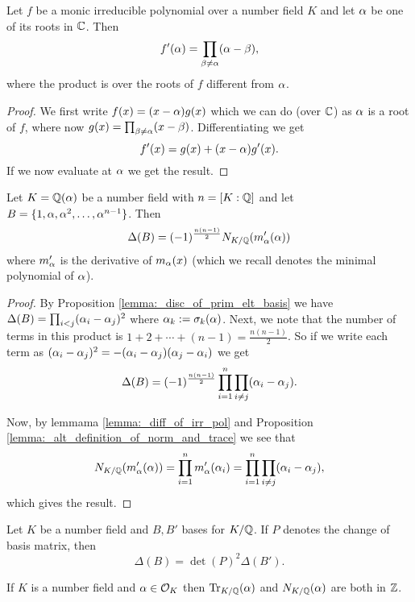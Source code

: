 \begin{lemma}\label{lemma:_diff_of_irr_pol}
	Let $f$ be a monic irreducible polynomial over a number field $K$ and let $\alpha$ be one of its roots in $\mathbb{C}$. Then \[f'(\alpha)=\prod_{\beta \neq \alpha} (\alpha-\beta),  \] where the product is over the roots of $f$ different from $\alpha$.
\end{lemma}

\begin{proof}
	We first write $f(x)=(x-\alpha)g(x)$ which we can do (over $\mathbb{C}$) as $\alpha$ is a root of $f$, where now $g(x)=\prod_{\beta \neq \alpha} (x-\beta)$. Differentiating we get \[f'(x)=g(x)+(x-\alpha)g'(x).\] If we now evaluate at $\alpha$ we get the result.
\end{proof}

\begin{lemma}\label{lemma:_num_field_disc_in_terms_of_norm}
	Let $K=\mathbb{Q}(\alpha)$ be a number field with $n=[K:\mathbb{Q}]$ and let $B=\{1,\alpha,\alpha^2,\dots,\alpha^{n-1}\}$. Then \[\Delta(B)=(-1)^{\frac{n(n-1)}{2}}N_{K/\mathbb{Q}}(m_\alpha'(\alpha))\] where $m_\alpha'$ is the derivative of $m_\alpha(x)$ (which we recall denotes the minimal polynomial of $\alpha$).	
\end{lemma}
\begin{proof}
	By Proposition \ref{lemma:_disc_of_prim_elt_basis} we have $\Delta(B)=\prod_{i < j}(\alpha_i-\alpha_j)^2$ where $\alpha_k:=\sigma_k(\alpha)$. Next, we note that the number of terms in this product is $1+2+\cdots+(n-1)=\frac{n(n-1)}{2}$. So if we write each term as $(\alpha_i-\alpha_j)^2=-(\alpha_i-\alpha_j)(\alpha_j-\alpha_i)$ we get \[\Delta(B)=(-1)^{\frac{n(n-1)}{2}}\prod_{i=1}^n \prod_{i \neq j} (\alpha_i-\alpha_j). \]
	
	Now, by lemmama \ref{lemma:_diff_of_irr_pol} and Proposition \ref{lemma:_alt_definition_of_norm_and_trace} we see that \[N_{K/\mathbb{Q}}(m_\alpha'(\alpha))=\prod_{i=1}^n m_\alpha'(\alpha_i)=\prod_{i=1}^n \prod_{i \neq j} (\alpha_i-\alpha_j),\] which gives the result.	
\end{proof}	

\begin{lemma}\label{lemma:_disc_change_of_basis}
	Let $K$ be a number field and $B,B'$ bases for $K/\mathbb{Q}$. If $P$ denotes the change of basis matrix, then \[\Delta(B)=\det(P)^2 \Delta(B').\]
\end{lemma}

\begin{lemma}\label{lemma:_norm_trace_of_alg_int_is_int}
	If $K$ is a number field and $\alpha \in \mathcal{O}_K$ then $\operatorname{Tr}_{K/\mathbb{Q}}(\alpha)$ and $N_{K/\mathbb{Q}}(\alpha)$ are both in $\mathbb{Z}$. 
\end{lemma}	

